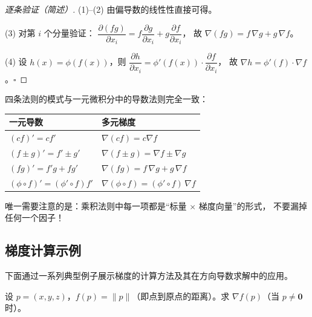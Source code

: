\documentclass[lang=cn,11pt]{elegantbook}
\begin{document}
\begin{proof}[逐条验证（简述）]
(1)--(2) 由偏导数的线性性直接可得。

(3) 对第 $i$ 个分量验证：
$\dfrac{\partial(fg)}{\partial x_i}=f\dfrac{\partial g}{\partial x_i}+g\dfrac{\partial f}{\partial x_i}$，
故 $\nabla(fg)=f\,\nabla g+g\,\nabla f$。

(4) 设 $h(x)=\phi(f(x))$，则
$\dfrac{\partial h}{\partial x_i}=\phi'(f(x))\cdot\dfrac{\partial f}{\partial x_i}$，
故 $\nabla h=\phi'(f)\cdot \nabla f$。\hfill$\square$
\end{proof}

\begin{remark}[记忆技巧]
四条法则的模式与一元微积分中的导数法则完全一致：
\begin{center}
\renewcommand{\arraystretch}{1.4}
\begin{tabular}{@{}ll@{}}
\hline
一元导数 & 多元梯度 \\
\hline
$(cf)'=cf'$ & $\nabla(cf)=c\nabla f$ \\
$(f\pm g)'=f'\pm g'$ & $\nabla(f\pm g)=\nabla f\pm \nabla g$ \\
$(fg)'=f'g+fg'$ & $\nabla(fg)=f\,\nabla g+g\,\nabla f$ \\
$(\phi\circ f)'=(\phi'\circ f)f'$ & $\nabla(\phi\circ f)=(\phi'\circ f)\,\nabla f$ \\
\hline
\end{tabular}
\end{center}
唯一需要注意的是：乘积法则中每一项都是“标量 $\times$ 梯度向量”的形式，
不要漏掉任何一个因子！
\end{remark}


\subsection{梯度计算示例}

下面通过一系列典型例子展示梯度的计算方法及其在方向导数求解中的应用。

\begin{exercise}[范数函数的梯度] \label{ex:grad-norm}
设 $p=(x,y,z)$，$f(p)=\|p\|$（即点到原点的距离）。求 $\nabla f(p)$（当 $p\neq\boldsymbol 0$ 时）。
\end{exercise}
\end{document}
